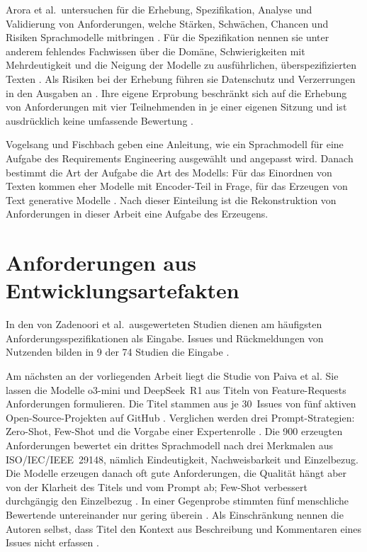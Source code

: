 \documentclass[11pt,a4paper]{report}
\begin{document}
Arora et al.\ untersuchen für die Erhebung, Spezifikation, Analyse und
Validierung von Anforderungen, welche Stärken, Schwächen, Chancen und
Risiken Sprachmodelle mitbringen \cite[Abschn.~3--6]{arora2023advancing}.
Für die Spezifikation nennen sie unter anderem fehlendes Fachwissen über
die Domäne, Schwierigkeiten mit Mehrdeutigkeit und die Neigung der
Modelle zu ausführlichen, überspezifizierten Texten
\cite[Abschn.~4.2]{arora2023advancing}. Als Risiken bei der Erhebung
führen sie Datenschutz und Verzerrungen in den Ausgaben an
\cite[Abschn.~3.2]{arora2023advancing}. Ihre eigene Erprobung beschränkt
sich auf die Erhebung von Anforderungen mit vier Teilnehmenden in je einer eigenen Sitzung und ist ausdrücklich keine umfassende Bewertung
\cite[Abschn.~7]{arora2023advancing}.

Vogelsang und Fischbach geben eine Anleitung, wie ein Sprachmodell für
eine Aufgabe des Requirements Engineering ausgewählt und angepasst wird.
Danach bestimmt die Art der Aufgabe die Art des Modells: Für das
Einordnen von Texten kommen eher Modelle mit Encoder-Teil in Frage, für
das Erzeugen von Text generative Modelle
\cite[Abschn.~3.1]{vogelsang2024llm}. Nach dieser Einteilung ist die
Rekonstruktion von Anforderungen in dieser Arbeit eine Aufgabe des
Erzeugens.

\section{Anforderungen aus Entwicklungsartefakten}
\label{sec:vw-artefakte}

In den von Zadenoori et al.\ ausgewerteten Studien dienen am häufigsten
Anforderungsspezifikationen als Eingabe. Issues und Rückmeldungen von
Nutzenden bilden in 9 der 74 Studien die Eingabe
\cite[Abschn.~5.2.3]{zadenoori2025slr}.

Am nächsten an der vorliegenden Arbeit liegt die Studie von Paiva et
al. Sie lassen die Modelle o3-mini und DeepSeek~R1 aus Titeln von
Feature-Requests Anforderungen formulieren. Die Titel stammen aus je
30~Issues von fünf aktiven Open-Source-Projekten auf GitHub
\cite[Abschn.~3.1]{paiva2026issue}. Verglichen werden drei
Prompt-Strategien: Zero-Shot, Few-Shot und die Vorgabe einer
Expertenrolle \cite[Abschn.~1]{paiva2026issue}. Die 900 erzeugten
Anforderungen bewertet ein drittes Sprachmodell nach drei Merkmalen aus
ISO/\allowbreak IEC/\allowbreak IEEE~29148, nämlich Eindeutigkeit,
Nachweisbarkeit und Einzelbezug. Die Modelle erzeugen danach oft gute
Anforderungen, die Qualität hängt aber von der Klarheit des Titels und
vom Prompt ab; Few-Shot verbessert durchgängig den Einzelbezug
\cite[Zusammenfassung]{paiva2026issue}. In einer Gegenprobe stimmten
fünf menschliche Bewertende untereinander nur gering überein
\cite[Abschn.~4.6.5]{paiva2026issue}. Als Einschränkung nennen die
Autoren selbst, dass Titel den Kontext aus Beschreibung und Kommentaren
eines Issues nicht erfassen \cite[Abschn.~5]{paiva2026issue}.
\end{document}
